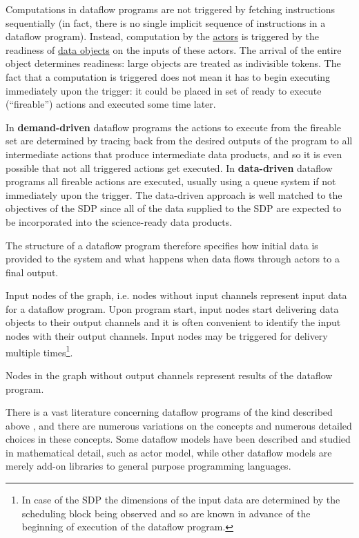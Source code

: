 \documentclass[11pt,a4paper]{article}
\begin{document}
Computations in dataflow programs are not triggered by fetching
instructions sequentially (in fact, there is no single implicit
sequence of instructions in a dataflow program). Instead, computation
by the \underline{actors} is triggered by the readiness of
\underline{data objects} on the inputs of these actors. The arrival of
the entire object determines readiness: large objects are treated as
indivisible tokens.  The fact that a computation is triggered does not
mean it has to begin executing immediately upon the trigger: it could
be placed in set of ready to execute (“fireable”) actions and executed
some time later.

In {\bf demand-driven} dataflow programs the actions to execute from
the fireable set are determined by tracing back from the desired
outputs of the program to all intermediate actions that produce
intermediate data products, and so it is even possible that not all
triggered actions get executed. In {\bf data-driven} dataflow programs
all fireable actions are executed, usually using a queue system if not
immediately upon the trigger. The data-driven approach is well matched
to the objectives of the SDP since all of the data supplied to the SDP
are expected to be incorporated into the science-ready data products.


The structure of a dataflow program therefore specifies how initial
data is provided to the system and what happens when data flows
through actors to a final output.

Input nodes of the graph, i.e. nodes without input channels represent
input data for a dataflow program.  Upon program start, input nodes
start delivering data objects to their output channels and it is often
convenient to identify the input nodes with their output
channels. Input nodes may be triggered for delivery multiple
times\footnote{In case of the SDP the dimensions of the input data are
  determined by the scheduling block being observed and so are known
  in advance of the beginning of execution of the dataflow program.}.

Nodes in the graph without output channels represent results of the dataflow program.

There is a vast literature concerning dataflow programs of the kind
described above \citep[see the review
by][]{Johnston:2004:ADP:1013208.1013209}, and there are numerous
variations on the concepts and numerous detailed choices in these
concepts.  Some dataflow models have been described and studied in
mathematical detail, such as \cite{Hewitt:1973:UMA:1624775.1624804}
actor model, while other dataflow models are merely add-on libraries
to general purpose programming languages.
\end{document}
